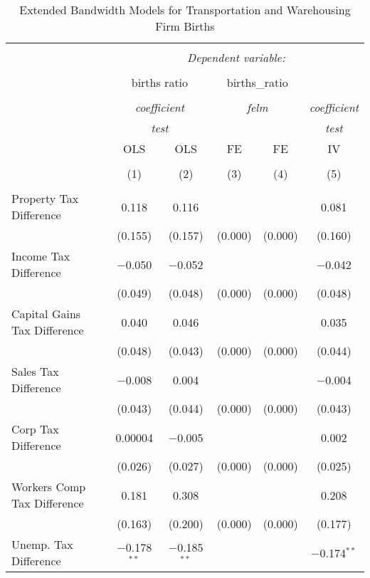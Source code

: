 
\begin{table}[!htbp] \centering 
  \caption{Extended Bandwidth Models for  Transportation and Warehousing Firm Births} 
  \label{} 
\begin{tabular}{@{\extracolsep{5pt}}lccccc} 
\\[-1.8ex]\hline 
\hline \\[-1.8ex] 
 & \multicolumn{5}{c}{\textit{Dependent variable:}} \\ 
\cline{2-6} 
\\[-1.8ex] & \multicolumn{2}{c}{births ratio} & \multicolumn{2}{c}{births\_ratio} &   \\ 
\\[-1.8ex] & \multicolumn{2}{c}{\textit{coefficient}} & \multicolumn{2}{c}{\textit{felm}} & \textit{coefficient} \\ 
 & \multicolumn{2}{c}{\textit{test}} & \multicolumn{2}{c}{\textit{}} & \textit{test} \\ 
 & OLS & OLS & FE & FE & IV \\ 
\\[-1.8ex] & (1) & (2) & (3) & (4) & (5)\\ 
\hline \\[-1.8ex] 
 Property Tax Difference & 0.118 & 0.116 &  &  & 0.081 \\ 
  & (0.155) & (0.157) & (0.000) & (0.000) & (0.160) \\ 
  Income Tax Difference & $-$0.050 & $-$0.052 &  &  & $-$0.042 \\ 
  & (0.049) & (0.048) & (0.000) & (0.000) & (0.048) \\ 
  Capital Gains Tax Difference & 0.040 & 0.046 &  &  & 0.035 \\ 
  & (0.048) & (0.043) & (0.000) & (0.000) & (0.044) \\ 
  Sales Tax Difference & $-$0.008 & 0.004 &  &  & $-$0.004 \\ 
  & (0.043) & (0.044) & (0.000) & (0.000) & (0.043) \\ 
  Corp Tax Difference & 0.00004 & $-$0.005 &  &  & 0.002 \\ 
  & (0.026) & (0.027) & (0.000) & (0.000) & (0.025) \\ 
  Workers Comp Tax Difference & 0.181 & 0.308 &  &  & 0.208 \\ 
  & (0.163) & (0.200) & (0.000) & (0.000) & (0.177) \\ 
  Unemp. Tax Difference & $-$0.178$^{**}$ & $-$0.185$^{**}$ &  &  & $-$0.174$^{**}$ \\ 

\end{tabular}
\end{table}

